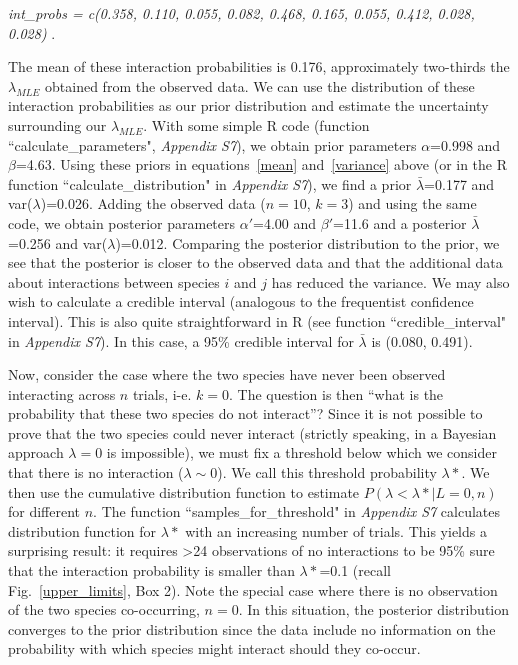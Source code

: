 \documentclass[12pt]{article}
\begin{document}
        \vspace{12pt}
        \noindent\emph{
           int\_probs = c(0.358, 0.110, 0.055, 0.082, 0.468, 0.165, 0.055, 0.412, 0.028, 0.028) }.
          \vspace{12pt}

        The mean of these interaction probabilities is 0.176, approximately two-thirds the $\lambda_{MLE}$ obtained from the observed data. We can use the distribution of these interaction probabilities as our prior distribution and estimate the uncertainty surrounding our $\lambda_{MLE}$. With some simple R code (function ``calculate\_parameters", \emph{Appendix S7}), we obtain prior parameters $\alpha$=0.998 and $\beta$=4.63. Using these priors in equations~\ref{mean} and~\ref{variance} above (or in the R function ``calculate\_distribution" in \emph{Appendix S7}), we find a prior $\bar\lambda$=0.177 and var($\lambda$)=0.026. Adding the observed data ($n=10$, $k=3$) and using the same code, we obtain posterior parameters $\alpha'$=4.00 and $\beta'$=11.6 and a posterior $\bar\lambda$=0.256 and var($\lambda$)=0.012. Comparing the posterior distribution to the prior, we see that the posterior is closer to the observed data and that the additional data about interactions between species $i$ and $j$ has reduced the variance. We may also wish to calculate a credible interval (analogous to the frequentist confidence interval). This is also quite straightforward in R (see function ``credible\_interval" in \emph{Appendix S7}). In this case, a 95\% credible interval for $\bar\lambda$ is (0.080, 0.491).


        Now, consider the case where the two species have never been observed interacting across $n$ trials, i-e. $k=0$. The question is then ``what is the probability that these two species do not interact''? Since it is not possible to prove that the two species could never interact (strictly speaking, in a Bayesian approach $\lambda=0$ is impossible), we must fix a threshold below which we consider that there is no interaction ($\lambda \sim 0$). We call this threshold probability $\lambda*$. We then use the cumulative distribution function to estimate $P(\lambda<\lambda*|L=0,n)$ for different $n$. The function ``samples\_for\_threshold" in \emph{Appendix S7} calculates distribution function for $\lambda*$ with an increasing number of trials. This yields a surprising result: it requires \textgreater24 observations of no interactions to be 95\% sure that the interaction probability is smaller than $\lambda*$=0.1 (recall Fig.~\ref{upper_limits}, Box 2). Note the special case where there is no observation of the two species co-occurring, $n = 0$.  In this situation, the posterior distribution converges to the prior distribution since the data include no information on the probability with which species might interact should they co-occur.
\end{document}
